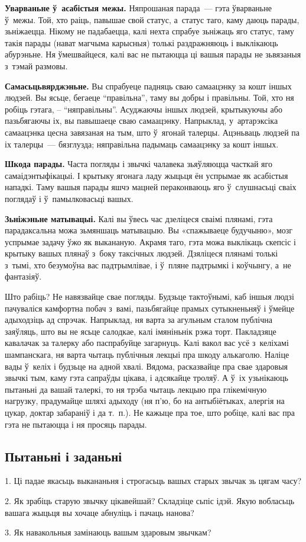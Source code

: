 \textbf{Уварваньне ў~асабістыя межы.} Няпрошаная парада~--- гэта ўварваньне ў~межы. Той, хто раіць, павышае свой статус, а~статус таго, каму даюць парады, зьніжаецца. Нікому не падабаецца, калі нехта спрабуе зьніжаць яго статус, таму такія парады (нават магчыма карысныя) толькі раздражняюць і выклікаюць абурэньне. Ня ўмешвайцеся, калі вас не пытаюцца ці вашыя парады не зьвязаныя з~тэмай размовы.

\textbf{Самасьцьвярджэньне.} Вы спрабуеце падняць сваю самаацэнку за кошт іншых людзей. Вы ясьце, бегаеце ``правільна'', таму вы добры і правільны. Той, хто ня робіць гэтага, -- ``няправільны''. Асуджаючы іншых людзей, крытыкуючы або пазьбягаючы іх, вы павышаеце сваю самаацэнку. Напрыклад, у~артарэксіка самаацэнка цесна завязаная на тым, што ў~ягонай талерцы. Ацэньваць людзей па іх талерцы~--- бязглузда; няправільна падымаць самаацэнку за кошт іншых.

\textbf{Шкода парады.} Часта погляды і звычкі чалавека зьяўляюцца часткай яго самаідэнтыфікацыі. І крытыку ягонага ладу жыцьця ён успрымае як асабістыя нападкі. Таму вашыя парады яшчэ мацней пераконваюць яго ў~слушнасьці сваіх поглядаў і ў~памылковасьці вашых.

\textbf{Зьніжэньне матывацыі.} Калі вы ўвесь час дзеліцеся сваімі плянамі, гэта парадаксальна можа зьмяншаць матывацыю. Вы «спажываеце будучыню», мозг успрымае задачу ўжо як выкананую. Акрамя таго, гэта можа выклікаць скепсіс і крытыку вашых плянаў з~боку таксічных людзей. Дзяліцеся плянамі толькі з~тымі, хто безумоўна вас падтрымлівае, і ў~пляне падтрымкі і коўчынгу, а~не фантазіяў.

Што рабіць? Не навязвайце свае погляды. Будзьце тактоўнымі, каб іншыя людзі пачуваліся камфортна побач з~вамі, пазьбягайце прамых сутыкненьняў і ўмейце адыходзіць ад спрэчак. Напрыклад, ня варта за агульным сталом публічна заяўляць, што вы не ясьце салодкае, калі імяніньнік рэжа торт. Пакладзяце кавалачак за талерку або паспрабуйце загарнуць. Калі вакол вас усё з~келіхамі шампанскага, ня варта чытаць публічныя лекцыі пра шкоду алькаголю. Наліце вады ў~келіх і будзьце на адной хвалі. Вядома, расказвайце пра свае здаровыя звычкі тым, каму гэта сапраўды цікава, і адсякайце троляў. А ў~іх узьнікаюць пытаньні да вашай талеркі, то ня трэба чытаць лекцыю пра глікемічную нагрузку, прадумайце шляхі адыходу (ня п'ю, бо на антыбіётыках, алергія на цукар, доктар забараніў і да т.~п.). Не кажыце пра тое, што робіце, калі вас пра гэта не пытаюцца і ня просяць парады.

\subsection*{Пытаньні і заданьні}

1. Ці падае якасьць выкананьня і строгасьць вашых старых звычак зь цягам часу?

2. Як зрабіць старую звычку цікавейшай? Складзіце сьпіс ідэй. Якую вобласьць вашага жыцьця вы хочаце абнуліць і пачаць нанова?

3. Як навакольныя замінаюць вашым здаровым звычкам?
